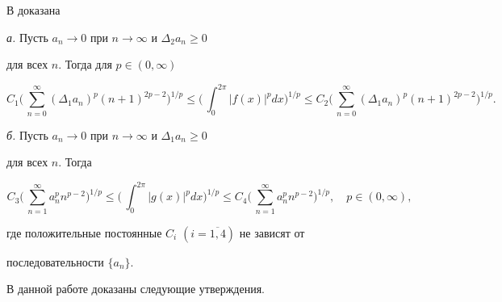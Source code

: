 В \cite{2} доказана





\begin{thmnonum}


{\em а.} Пусть $a_n\to 0$ при $n\to\infty$ и $\Delta_2a_n\ge 0$


для всех $n$. Тогда для $p\in(0,\infty)$


$$


C_1\biggl(\,\sum^\infty_{n=0}(\Delta_1a_n)^p(n+1)^{2p-2}


\biggr)^{1/p}\le\biggl(\,\int^{2\pi}_0|f(x)|^p dx\biggr)^{1/p}\le


C_2\biggl(\,\sum^\infty_{n=0}(\Delta_1a_n)^p(n+1)^{2p-2}


\biggr)^{1/p}.


$$





{\em б.} Пусть $a_n\to 0$ при $n\to\infty$ и $\Delta_1a_n\ge 0$


для всех $n$. Тогда 


$$


C_3\biggl(\,\sum^\infty_{n=1}a^p_n n^{p-2}\biggr)^{1/p}\le


\biggl(\,\int^{2\pi}_0|g(x)|^p dx\biggr)^{1/p}\le


C_4\biggl(\,\sum^\infty_{n=1}a^p_n n^{p-2}\biggr)^{1/p},\quad p\in(0,\infty),


$$


где положительные постоянные $C_i$ $(i=\overline{1,4})$ не зависят от


последовательности $\{a_n\}$.


\end{thmnonum}





В данной работе доказаны следующие утверждения.





